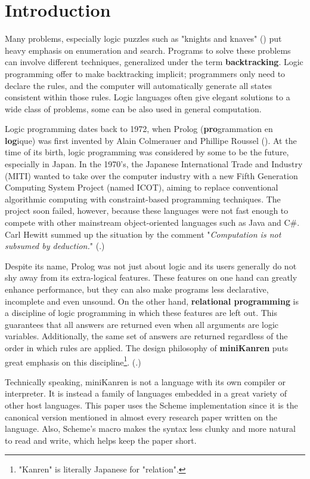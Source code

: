 \section{Introduction}
Many problems, especially logic puzzles such as "knights and knaves" (\cite{knight}) put heavy emphasis on enumeration and search. Programs to solve these problems can involve different techniques, generalized under the term \textbf{backtracking}. Logic programming offer to make backtracking implicit; programmers only need to declare the rules, and the computer will automatically generate all states consistent within those rules. Logic languages often give elegant solutions to a wide class of problems, some can be also used in general computation.

Logic programming dates back to 1972, when Prolog (\textbf{pro}grammation en \textbf{log}ique) was first invented by Alain Colmerauer and Phillipe Roussel (\cite{early-prolog}). At the time of its birth, logic programming was considered by some to be the future, especially in Japan. In the 1970's, the Japanese International Trade and Industry (MITI) wanted to take over the computer industry with a new Fifth Generation Computing System Project (named ICOT), aiming to replace conventional algorithmic computing with constraint-based programming techniques. The project soon failed, however, because these languages were not fast enough to compete with other mainstream object-oriented languages such as Java and C\#. Carl Hewitt summed up the situation by the comment "\textit{Computation is not subsumed by deduction.}" (\cite{logic-fail}.)

Despite its name, Prolog was not just about logic and its users generally do not shy away from its extra-logical features. These features on one hand can greatly enhance performance, but they can also make programs less declarative, incomplete and even unsound. On the other hand, \textbf{relational programming} is a discipline of logic programming in which these features are left out. This guarantees that all answers are returned even when all arguments are logic variables. Additionally, the same set of answers are returned regardless of the order in which rules are applied. The design philosophy of \textbf{miniKanren} puts great emphasis on this discipline\footnote{"Kanren" is literally Japanese for "relation".}. (\cite{byrdphd}.)

Technically speaking, miniKanren is not a language with its own compiler or interpreter. It is instead a family of languages embedded in a great variety of other host languages. This paper uses the Scheme implementation since it is the canonical version mentioned in almost every research paper written on the language. Also, Scheme's macro makes the syntax less clunky and more natural to read and write, which helps keep the paper short.


